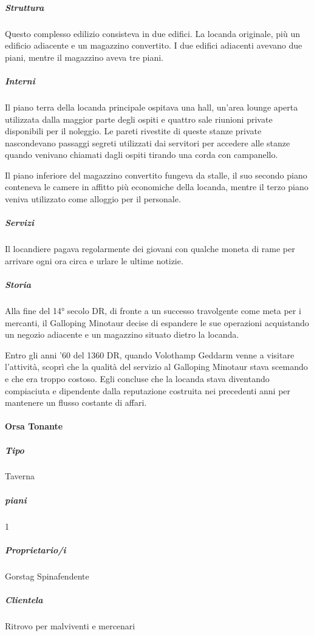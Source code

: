 \documentclass{article}
\begin{document}
                      \subparagraph{Struttura}
Questo complesso edilizio consisteva in due edifici. La locanda originale, più un edificio adiacente e un magazzino convertito. I due edifici adiacenti avevano due piani, mentre il magazzino aveva tre piani.

                      \subparagraph{Interni}
Il piano terra della locanda principale ospitava una hall, un'area lounge aperta utilizzata dalla maggior parte degli ospiti e quattro sale riunioni private disponibili per il noleggio. Le pareti rivestite di queste stanze private nascondevano passaggi segreti utilizzati dai servitori per accedere alle stanze quando venivano chiamati dagli ospiti tirando una corda con campanello.

Il piano inferiore del magazzino convertito fungeva da stalle, il suo secondo piano conteneva le camere in affitto più economiche della locanda, mentre il terzo piano veniva utilizzato come alloggio per il personale.

                      \subparagraph{Servizi}
Il locandiere pagava regolarmente dei giovani con qualche moneta di rame per arrivare ogni ora circa e urlare le ultime notizie.

                      \subparagraph{Storia}
Alla fine del 14° secolo DR, di fronte a un successo travolgente come meta per i mercanti, il Galloping Minotaur decise di espandere le sue operazioni acquistando un negozio adiacente e un magazzino situato dietro la locanda.

Entro gli anni '60 del 1360 DR, quando Volothamp Geddarm venne a visitare l'attività, scoprì che la qualità del servizio al Galloping Minotaur stava scemando e che era troppo costoso. Egli concluse che la locanda stava diventando compiaciuta e dipendente dalla reputazione costruita nei precedenti anni per mantenere un flusso costante di affari.


                  \paragraph{Orsa Tonante}

                      \subparagraph{Tipo}
                      Taverna

                      \subparagraph{piani}
                            1



                      \subparagraph{Proprietario/i}
                        Gorstag Spinafendente

                      \subparagraph{Clientela}
                        Ritrovo per malviventi e mercenari
\end{document}
